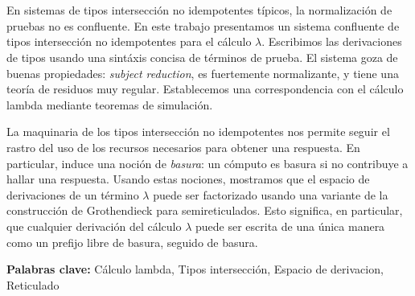 \section*{}
En sistemas de tipos intersección no idempotentes típicos, la normalización de pruebas no es confluente.
En este trabajo presentamos un sistema confluente de tipos intersección no idempotentes para el cálculo $\lambda$.
Escribimos las derivaciones de tipos usando una sintáxis concisa de términos de prueba.
El sistema goza de buenas propiedades: \emph{subject reduction}, es fuertemente normalizante, y tiene una teoría de
residuos muy regular.
Establecemos una correspondencia con el cálculo lambda mediante teoremas de simulación.

La maquinaria de los tipos intersección no idempotentes nos permite seguir el rastro del uso de los recursos
necesarios para obtener una respuesta.
En particular, induce una noción de \textit{basura}: un cómputo es basura si no contribuye a hallar una respuesta.
Usando estas nociones, mostramos que el espacio de derivaciones de un término $\lambda$ puede ser factorizado
usando una variante de la construcción de Grothendieck para semireticulados.
Esto significa, en particular, que cualquier derivación del cálculo $\lambda$ puede ser escrita
de una única manera como un prefijo libre de basura, seguido de basura.

\vspace{2cm}
\noindent
\textbf{Palabras clave:} Cálculo lambda, Tipos intersección, Espacio de derivacion, Reticulado

